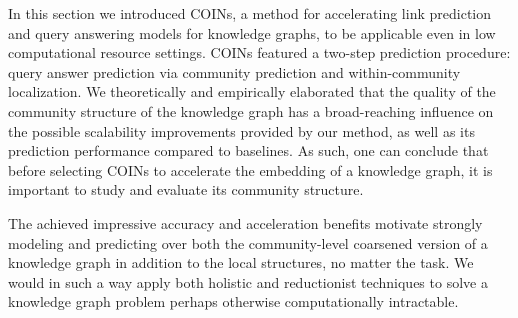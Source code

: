In this section we introduced COINs, a method for accelerating link prediction and query answering models for knowledge graphs, to be applicable even in low computational resource settings. COINs featured a two-step prediction procedure: query answer prediction via community prediction and within-community localization. 
We theoretically and empirically elaborated that the quality of the community structure of the knowledge graph has a broad-reaching influence on the possible scalability improvements provided by our method, as well as its prediction performance compared to baselines. As such, one can conclude that before selecting COINs to accelerate the embedding of a knowledge graph, it is important to study and evaluate its community structure. 

The achieved impressive accuracy and acceleration benefits motivate strongly modeling and predicting over both the community-level coarsened version of a knowledge graph in addition to the local structures, no matter the task. We would in such a way apply both holistic and reductionist techniques to solve a knowledge graph problem perhaps otherwise computationally intractable.